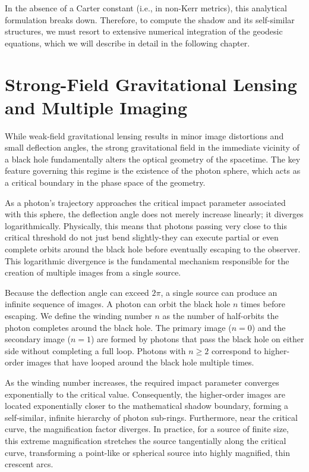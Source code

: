 \documentclass[11pt]{book}
\begin{document}
In the absence of a Carter constant (i.e., in non-Kerr metrics), this analytical formulation breaks down. Therefore, to compute the shadow and its self-similar structures, we must resort to extensive numerical integration of the geodesic equations, which we will describe in detail in the following chapter.
\section{Strong-Field Gravitational Lensing and Multiple Imaging}
\label{sec:strong_lensing}

While weak-field gravitational lensing results in minor image distortions and small deflection angles, the strong gravitational field in the immediate vicinity of a black hole fundamentally alters the optical geometry of the spacetime. The key feature governing this regime is the existence of the photon sphere, which acts as a critical boundary in the phase space of the geometry. 

As a photon's trajectory approaches the critical impact parameter associated with this sphere, the deflection angle does not merely increase linearly; it diverges logarithmically. Physically, this means that photons passing very close to this critical threshold do not just bend slightly-they can execute partial or even complete orbits around the black hole before eventually escaping to the observer. This logarithmic divergence is the fundamental mechanism responsible for the creation of multiple images from a single source.

Because the deflection angle can exceed $2\pi$, a single source can produce an infinite sequence of images. A photon can orbit the black hole $n$ times before escaping. We define the winding number $n$ as the number of half-orbits the photon completes around the black hole. The primary image ($n=0$) and the secondary image ($n=1$) are formed by photons that pass the black hole on either side without completing a full loop. Photons with $n \geq 2$ correspond to higher-order images that have looped around the black hole multiple times.

As the winding number increases, the required impact parameter converges exponentially to the critical value. Consequently, the higher-order images are located exponentially closer to the mathematical shadow boundary, forming a self-similar, infinite hierarchy of photon sub-rings. Furthermore, near the critical curve, the magnification factor diverges. In practice, for a source of finite size, this extreme magnification stretches the source tangentially along the critical curve, transforming a point-like or spherical source into highly magnified, thin crescent arcs.
\end{document}
